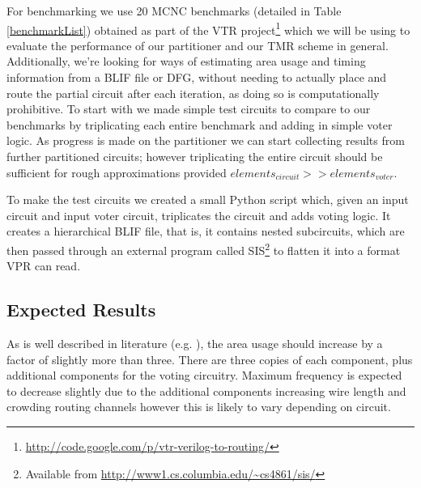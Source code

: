 \documentclass[12pt,final,oneside]{dwThesis} %
\begin{document}
For benchmarking we use 20 MCNC benchmarks (detailed in Table \ref{benchmarkList}) obtained as part of the \ac{VTR} project\footnote{\url{http://code.google.com/p/vtr-verilog-to-routing/}} which we will be using to evaluate the performance of our partitioner and our \ac{TMR} scheme in general.
Additionally, we're looking for ways of estimating area usage and timing information from a \ac{BLIF} file or \ac{DFG}, without needing to actually place and route the partial circuit after each iteration, as doing so is computationally prohibitive.
To start with we made simple test circuits to compare to our benchmarks by triplicating each entire benchmark and adding in simple voter logic. As progress is made on the partitioner we can start collecting results from further partitioned circuits; however triplicating the entire circuit should be sufficient for rough approximations provided $elements_{circuit} >> elements_{voter}$.

To make the test circuits we created a small Python script which, given an input circuit and input voter circuit, triplicates the circuit and adds voting logic. It creates a hierarchical \ac{BLIF} file, that is, it contains nested subcircuits, which are then passed through an external program called \ac{SIS}\footnote{Available from \url{http://www1.cs.columbia.edu/~cs4861/sis/}} to flatten it into a format \ac{VPR} can read.

\subsection{Expected Results}
As is well described in literature (e.g. \cite{HardeningTechniques}), the area usage should increase by a factor of slightly more than three. There are three copies of each component, plus additional components for the voting circuitry. Maximum frequency is expected to decrease slightly due to the additional components increasing wire length and crowding routing channels however this is likely to vary depending on circuit.
\end{document}

